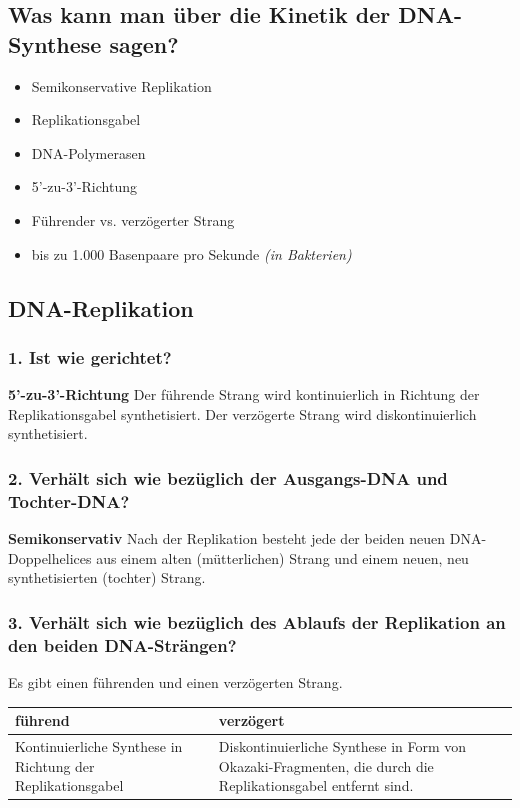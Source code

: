\documentclass{article}
\begin{document}
\subsection*{Was kann man über die Kinetik der DNA-Synthese sagen?}
\begin{itemize}
    \item Semikonservative Replikation
    \item Replikationsgabel
    \item DNA-Polymerasen
    \item 5'-zu-3'-Richtung
    \item Führender vs. verzögerter Strang
    \item bis zu 1.000 Basenpaare pro Sekunde \textit{(in Bakterien)}
\end{itemize} 

\subsection*{DNA-Replikation}
\subsubsection*{1. Ist wie gerichtet?} 
\textbf{5'-zu-3'-Richtung }\newline
Der führende Strang wird kontinuierlich in Richtung der Replikationsgabel synthetisiert. Der verzögerte Strang wird diskontinuierlich synthetisiert. 
\subsubsection*{2. Verhält sich wie bezüglich der Ausgangs-DNA und Tochter-DNA?} 
\textbf{Semikonservativ} \newline
Nach der Replikation besteht jede der beiden neuen DNA-Doppelhelices aus einem alten (mütterlichen) Strang und einem neuen, neu synthetisierten (tochter) Strang.
\subsubsection*{3. Verhält sich wie bezüglich des Ablaufs der Replikation an den beiden DNA-Strängen?} 
Es gibt einen führenden und einen verzögerten Strang.
\begin{table}[h]
    \centering
    \begin{tabular}{|p{7cm}|p{7cm}|} \hline
     führend & verzögert \\ \hline \hline
    Kontinuierliche Synthese in Richtung der Replikationsgabel &  Diskontinuierliche Synthese in Form von Okazaki-Fragmenten, die durch die Replikationsgabel entfernt sind.  \\\hline
\end{tabular}
\end{table} 
\end{document}
